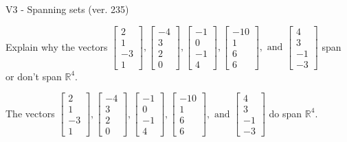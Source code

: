 \begin{exercise}
  \begin{exerciseTitle}V3 - Spanning sets (ver. 235)\end{exerciseTitle}
  \begin{exerciseStatement}
    Explain why the vectors \(\left[\begin{array}{r}
2 \\
1 \\
-3 \\
1
\end{array}\right] , \left[\begin{array}{r}
-4 \\
3 \\
2 \\
0
\end{array}\right] , \left[\begin{array}{r}
-1 \\
0 \\
-1 \\
4
\end{array}\right] , \left[\begin{array}{r}
-10 \\
1 \\
6 \\
6
\end{array}\right] , \text{ and } \left[\begin{array}{r}
4 \\
3 \\
-1 \\
-3
\end{array}\right]\) span or don't span \(\mathbb{R}^4\). 
	


  \end{exerciseStatement}
  \begin{exerciseAnswer}
   The vectors \(\left[\begin{array}{r}
2 \\
1 \\
-3 \\
1
\end{array}\right] , \left[\begin{array}{r}
-4 \\
3 \\
2 \\
0
\end{array}\right] , \left[\begin{array}{r}
-1 \\
0 \\
-1 \\
4
\end{array}\right] , \left[\begin{array}{r}
-10 \\
1 \\
6 \\
6
\end{array}\right] , \text{ and } \left[\begin{array}{r}
4 \\
3 \\
-1 \\
-3
\end{array}\right]\) 
  	 do  
	span \(\mathbb{R}^4\).
  



\end{exerciseAnswer}
\end{exercise}
